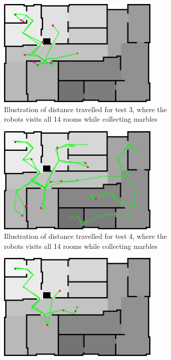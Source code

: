 \documentclass[../Head/Main.tex]{subfiles}
\begin{document}
\begin{figure}[H]
  \begin{subfigure}[b]{0.49\textwidth}
    \centering
    \includegraphics[width=0.85\textwidth]{../Figures/Modelbased/brushfireMarble3}
    \caption{Illustration of distance travelled for test 3, where the robots visits all 14 rooms while collecting marbles}
    \label{fig:Marble3}
  \end{subfigure}
  \hfill
  \begin{subfigure}[b]{0.49\textwidth}
    \centering
    \includegraphics[width=0.85\textwidth]{../Figures/Modelbased/brushfireMarble4}
    \caption{Illustration of distance travelled for test 4, where the robots visits all 14 rooms while collecting marbles}
    \label{fig:Marble4}
  \end{subfigure}
  \hfill
  \begin{subfigure}[b]{0.49\textwidth}
  \centering
  \includegraphics[width=0.85\textwidth]{../Figures/Modelbased/brushfireMarble5}

\end{subfigure}
\end{figure}
\end{document}

